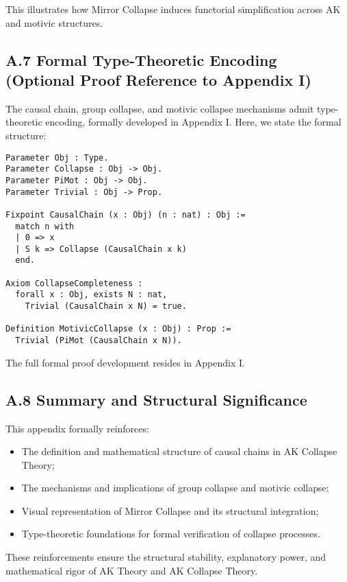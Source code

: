 \documentclass[11pt]{article}
\begin{document}
This illustrates how Mirror Collapse induces functorial simplification across AK and motivic structures.

\subsection*{A.7 Formal Type-Theoretic Encoding (Optional Proof Reference to Appendix I)}

The causal chain, group collapse, and motivic collapse mechanisms admit type-theoretic encoding, formally developed in Appendix I. Here, we state the formal structure:

\begin{lstlisting}[language=Coq, caption=Causal Chain and Collapse Encoding]
Parameter Obj : Type.
Parameter Collapse : Obj -> Obj.
Parameter PiMot : Obj -> Obj.
Parameter Trivial : Obj -> Prop.

Fixpoint CausalChain (x : Obj) (n : nat) : Obj :=
  match n with
  | 0 => x
  | S k => Collapse (CausalChain x k)
  end.

Axiom CollapseCompleteness :
  forall x : Obj, exists N : nat,
    Trivial (CausalChain x N) = true.

Definition MotivicCollapse (x : Obj) : Prop :=
  Trivial (PiMot (CausalChain x N)).
\end{lstlisting}

The full formal proof development resides in Appendix I.

\subsection*{A.8 Summary and Structural Significance}

This appendix formally reinforces:

\begin{itemize}
    \item The definition and mathematical structure of causal chains in AK Collapse Theory;
    \item The mechanisms and implications of group collapse and motivic collapse;
    \item Visual representation of Mirror Collapse and its structural integration;
    \item Type-theoretic foundations for formal verification of collapse processes.
\end{itemize}

These reinforcements ensure the structural stability, explanatory power, and mathematical rigor of AK Theory and AK Collapse Theory.
\end{document}
